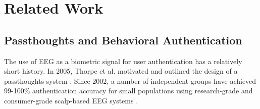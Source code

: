 \documentclass{sigchi}
\begin{document}
\section{Related Work}

\subsection{Passthoughts and Behavioral Authentication}
The use of EEG as a biometric signal for user authentication has a relatively short history.
In 2005, Thorpe et al. motivated and outlined the design of a passthoughts system \cite{Thorpe2005}.
Since 2002, a number of independent groups have achieved 99-100\% authentication accuracy for small populations using research-grade and consumer-grade scalp-based EEG systems \cite{Poulos2002,Marcel2007a,Ashby2011,Chuang2013b}.

\end{document}
